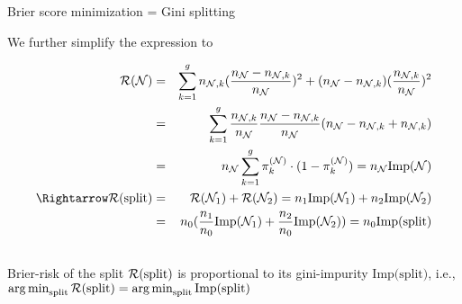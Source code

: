 \documentclass[11pt,compress,t,notes=noshow, xcolor=table]{beamer}
\begin{document}
\begin{frame2}[footnotesize]{Brier score minimization = Gini splitting}

We further simplify the expression to

\begin{eqnarray*}
\risk(\Np) &=&  \sum_{k = 1}^g n_{\Np,k}(\frac{n_{\Np } - n_{\Np,k}}{n_{\Np }})^2 + (n_{\Np } - n_{\Np,k})(\frac{n_{\Np,k}}{n_{\Np }})^2 \\
&=& \sum_{k = 1}^g \frac{n_{\Np,k}}{n_{\Np }} \frac{n_{\Np } - n_{\Np,k}}{n_{\Np }} (n_{\Np } - n_{\Np,k } + n_{\Np,k}) \\
&=& n_{\Np } \sum_{k = 1}^g \pikN \cdot (1 - \pikN ) = n_\Np \text{Imp}(\Np)\\
 \Rightarrow \risk(\text{split}) &=& \risk(\Np_1) + \risk(\Np_2)  = n_1 \text{Imp}(\Np_1) + n_2 \text{Imp}(\Np_2)\\
 &=&n_0 (\frac{n_1}{n_0} \text{Imp}(\Np_1) + \frac{n_2}{n_0} \text{Imp}(\Np_2)) = n_0\text{Imp(split)}\\
\
\end{eqnarray*} 
Brier-risk of the split $\mathcal{R}(\text{split})$ is proportional to its gini-impurity $\text{Imp(split)}$, i.e., $\mathop{\mathrm{arg\,min}}_\text{split} \mathcal{R}(\text{split}) = \mathop{\mathrm{arg\,min}}_\text{split} \text{Imp(split)}$\\

\end{frame2}


\endlecture
\end{document}
